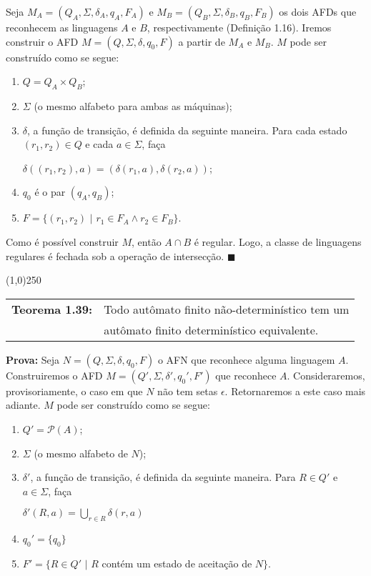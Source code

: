 \documentclass[12pt,a4paper,oneside]{article}
\begin{document}
Seja $M_A = ( Q_A, \Sigma, \delta_A, q_A, F_A )$ e $M_B = ( Q_B, \Sigma, \delta_B, q_B, F_B )$ os dois AFDs que reconhecem as linguagens $A$ e $B$, respectivamente (Definição 1.16). Iremos construir o AFD $M = ( Q, \Sigma, \delta, q_0, F )$ a partir de $M_A$ e $M_B$. $M$ pode ser construído como se segue:

\begin{enumerate}
	\item $Q = Q_A \times Q_B$;
	\item $\Sigma$ (o mesmo alfabeto para ambas as máquinas);
	\item $\delta$, a função de transição, é definida da seguinte maneira. Para cada estado $(r_1,r_2) \in Q$ e cada $a \in \Sigma$, faça
		\begin{center}
			$\delta( (r_1, r_2), a ) = (\delta(r_1,a), \delta(r_2,a)) $;
		\end{center}
	\item $q_0$ é o par $(q_A, q_B)$;
	\item $F = \{ (r_1, r_2) \mbox{ | } r_1 \in F_A \wedge r_2 \in F_B \}$.
\end{enumerate}

Como é possível construir $M$, então $A \cap B$ é regular. Logo, a classe de linguagens regulares é fechada sob a operação de intersecção. $\blacksquare$

\begin{center}
\line(1,0){250}
\end{center}

\begin{flushleft}
	\begin{tabular}{ll}
		{\bf Teorema 1.39:} & Todo autômato finito não-determinístico tem um \\
							& autômato finito determinístico equivalente.
	\end{tabular}
\end{flushleft}

{\bf Prova:} Seja $N = (Q, \Sigma, \delta, q_0, F)$ o AFN que reconhece alguma linguagem $A$. Construiremos o AFD $M = (Q', \Sigma, \delta', q_0', F' )$ que reconhece $A$. Consideraremos, provisoriamente, o caso em que $N$ não tem setas $\epsilon$. Retornaremos a este caso mais adiante. $M$ pode ser construído como se segue:

	\begin{enumerate}
		\item $Q' = \mathcal{P}(A)$;
		\item $\Sigma$ (o mesmo alfabeto de $N$);
		\item $\delta'$, a função de transição, é definida da seguinte maneira. Para $R \in Q'$ e $a \in \Sigma$, faça 
			\begin{center}
				$\delta'(R,a) = \bigcup\limits_{r \in R} \delta (r,a)$
			\end{center}
		\item $q_0' = \{ q_0 \}$
		\item $F' = \{ R \in Q' \mbox{ | } R$ contém um estado de aceitação de $N \}$.
	\end{enumerate}
\end{document}
